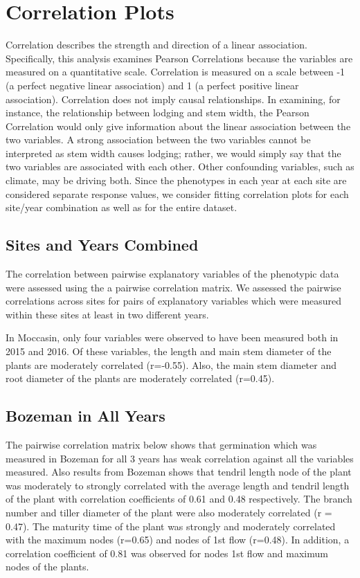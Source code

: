\documentclass[11pt]{article}\usepackage[]{graphicx}\usepackage[]{color}
\begin{document}
\section{Correlation Plots}
Correlation describes the strength and direction of a linear association. Specifically, this analysis examines Pearson Correlations because the variables are measured on a quantitative scale.  Correlation is measured on a scale between -1 (a perfect negative linear association) and 1 (a perfect positive linear association). Correlation does not imply causal relationships. In examining, for instance, the relationship between lodging and stem width, the Pearson Correlation would only give information about the linear association between the two variables.  A strong association between the two variables cannot be interpreted as stem width causes lodging; rather, we would simply say that the two variables are associated with each other. Other confounding variables, such as climate, may be driving both. Since the phenotypes in each year at each site are considered separate response values, we consider fitting correlation plots for each site/year combination as well as for the entire dataset. 

\subsection{Sites and Years Combined}
The correlation between pairwise explanatory variables of the phenotypic data were assessed using the a pairwise correlation matrix. We assessed the pairwise correlations across sites for pairs of explanatory variables which were measured within these sites at least in two different years.

In Moccasin, only four variables were observed to have been measured both in 2015 and 2016. Of these variables, the length and main stem diameter of the plants are moderately correlated (r=-0.55). Also, the main stem diameter and root diameter of the plants are moderately correlated (r=0.45).
\pagebreak
\subsection{Bozeman in All Years}
The pairwise correlation matrix below shows that germination which was measured in Bozeman for all 3 years has weak correlation against all the variables measured. Also results from Bozeman shows that tendril length node of the plant was moderately to strongly correlated with the average length and tendril length of the plant with correlation coefficients of 0.61 and 0.48 respectively. The branch number and tiller diameter of the plant were also moderately correlated (r = 0.47). The maturity time of the plant was strongly and moderately correlated with the maximum nodes (r=0.65) and nodes of 1st flow (r=0.48). In addition, a correlation coefficient of 0.81 was observed for nodes 1st flow and maximum nodes of the plants.
\end{document}
